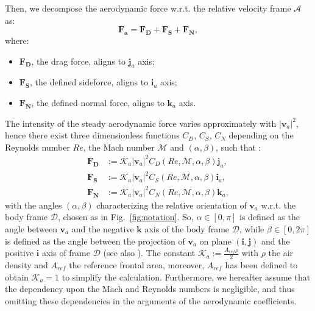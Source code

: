 Then, we decompose the aerodynamic force w.r.t. the relative velocity frame $\mathcal{A}$ as:
\begin{equation}
\label{eq:af_total_control}
\boldsymbol{{F}_a}=\boldsymbol{{F}_D}+\boldsymbol{{F}_S}+\boldsymbol{{F}_N} ,
\end{equation}
where:
\begin{itemize}
    \item $\boldsymbol{{F}_D}$, the drag force, aligns to $\boldsymbol{j}_a$ axis;
    \item $\boldsymbol{{F}_S}$, the defined sideforce, aligns to $\boldsymbol{i}_a$ axis;
    \item $\boldsymbol{{F}_N}$, the defined normal force, aligns to $\boldsymbol{k}_a$ axis.
\end{itemize}
The intensity of the steady aerodynamic force varies approximately with $|\boldsymbol{v}_a|^2$, hence there exist three dimensionless functions $C_D$, $C_S$, $C_N$ depending on the Reynolds number $Re$, the Mach number $\mathcal{M}$ and $(\alpha, \beta)$, such that \cite{c3}\cite{c5}:
\begin{subequations}
\begin{align}
    \boldsymbol{{F}_D} & :=\mathcal{K}_a|\boldsymbol{v}_a|^2C_D(Re, \mathcal{M}, \alpha, \beta)\boldsymbol{j}_a,\\
    \boldsymbol{{F}_S} & :=\mathcal{K}_a|\boldsymbol{v}_a|^2C_S(Re, \mathcal{M}, \alpha, \beta)\boldsymbol{i}_a,\\
    \boldsymbol{{F}_N} & :=\mathcal{K}_a|\boldsymbol{v}_a|^2C_N(Re, \mathcal{M}, \alpha, \beta)\boldsymbol{k}_a,
\end{align}
\label{eq:af_coe}
\end{subequations}
\noindent with the angles $(\alpha, \beta)$ characterizing the relative orientation of $\boldsymbol{v}_a$ w.r.t. the body frame $\mathcal{D}$, chosen as in  Fig.~\ref{fig:notation}. So, $\alpha \in [0,\pi]$ is defined as the angle between $\boldsymbol{v}_a$ and the negative $\boldsymbol{k}$ axis of the body frame $\mathcal{D}$, while $\beta \in [0,2\pi]$ is defined as the angle between the projection of $\boldsymbol{v}_a$ on plane $(\boldsymbol{i},\boldsymbol{j})$ and the positive $\boldsymbol{i}$ axis of frame $\mathcal{D}$ (see also \cite{c3}). The constant $\mathcal{K}_a:=\frac{A_{ref}\rho}{2}$ with $\rho$ the air density and $A_{ref}$ the reference frontal area, moreover, $A_{ref}$ has been defined to obtain $\mathcal{K}_a = 1$ to simplify the calculation. Furthermore, we hereafter assume that the dependency upon the Mach and Reynolds numbers is negligible, and thus omitting these dependencies in the arguments of the aerodynamic coefficients. 

